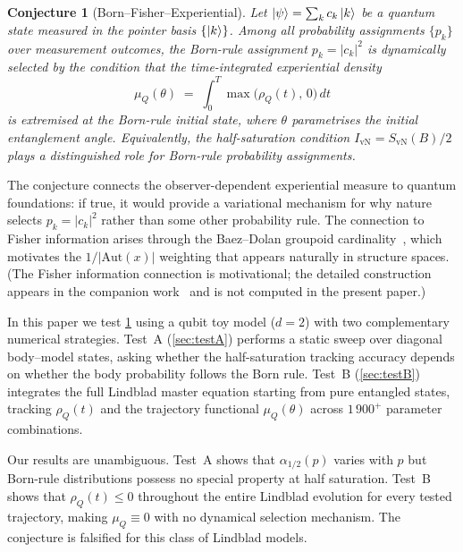\documentclass[12pt,a4paper]{article}
\newtheorem{conjecture}{Conjecture}
\newcommand{\SvN}{S_{\mathrm{vN}}}
\newcommand{\IvN}{I_{\mathrm{vN}}}
\newcommand{\rhoQ}{\rho_Q}
\newcommand{\muQ}{\mu_Q}
\begin{document}
\begin{conjecture}[Born--Fisher--Experiential]\label{conj:BFE}
  Let $\ket{\psi} = \sum_k c_k \ket{k}$ be a quantum state
  measured in the pointer basis $\{\ket{k}\}$.
  Among all probability assignments $\{p_k\}$ over measurement
  outcomes, the Born-rule assignment $p_k = |c_k|^2$ is
  dynamically selected by the condition that the time-integrated
  experiential density
  \begin{equation}\label{eq:muQ}
    \muQ(\theta)
    \;=\; \int_0^{T} \max\!\bigl(\rhoQ(t),\, 0\bigr)\, dt
  \end{equation}
  is extremised at the Born-rule initial state, where $\theta$
  parametrises the initial entanglement angle.
  Equivalently, the half-saturation condition
  $\IvN = \SvN(B)/2$ plays a distinguished role for Born-rule
  probability assignments.
\end{conjecture}

The conjecture connects the observer-dependent experiential measure
to quantum foundations: if true, it would provide a variational
mechanism for why nature selects $p_k = |c_k|^2$ rather than some
other probability rule.  The connection to Fisher information arises
through the Baez--Dolan groupoid cardinality~\cite{Baez2001}, which
motivates the $1/|\mathrm{Aut}(x)|$ weighting that appears
naturally in structure spaces.  (The Fisher information connection is
motivational; the detailed construction appears in the companion
work~\cite{Ehrlich2026a} and is not computed in the present paper.)

In this paper we test \cref{conj:BFE} using a qubit toy model
($d = 2$) with two complementary numerical strategies.  Test~A
(\cref{sec:testA}) performs a static sweep over diagonal
body--model states, asking whether the half-saturation tracking
accuracy depends on whether the body probability follows the Born
rule.  Test~B (\cref{sec:testB}) integrates the full Lindblad master
equation starting from pure entangled states, tracking $\rhoQ(t)$
and the trajectory functional $\muQ(\theta)$ across $1\,900^{+}$
parameter combinations.

Our results are unambiguous.  Test~A shows that $\alpha_{1/2}(p)$
varies with $p$ but Born-rule distributions possess no special
property at half saturation.  Test~B shows that $\rhoQ(t) \le 0$
throughout the entire Lindblad evolution for every tested trajectory,
making $\muQ \equiv 0$ with no dynamical selection mechanism.  The
conjecture is falsified for this class of Lindblad models.
\end{document}
